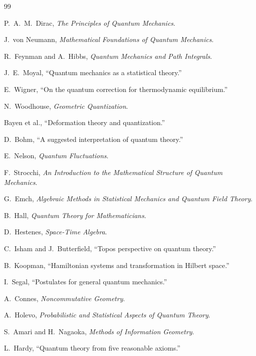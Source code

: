 \documentclass[11pt]{article}
\begin{document}
\begin{thebibliography}{99}

P.~A.~M.~Dirac,
\textit{The Principles of Quantum Mechanics}.

J.~von Neumann,
\textit{Mathematical Foundations of Quantum Mechanics}.

R.~Feynman and A.~Hibbs,
\textit{Quantum Mechanics and Path Integrals}.

J.~E.~Moyal,
``Quantum mechanics as a statistical theory.''

E.~Wigner,
``On the quantum correction for thermodynamic equilibrium.''

N.~Woodhouse,
\textit{Geometric Quantization}.

Bayen et al.,
``Deformation theory and quantization.''

D.~Bohm,
``A suggested interpretation of quantum theory.''

E.~Nelson,
\textit{Quantum Fluctuations}.

F.~Strocchi,
\textit{An Introduction to the Mathematical Structure of Quantum Mechanics}.

G.~Emch,
\textit{Algebraic Methods in Statistical Mechanics and Quantum Field Theory}.

B.~Hall,
\textit{Quantum Theory for Mathematicians}.

D.~Hestenes,
\textit{Space-Time Algebra}.

C.~Isham and J.~Butterfield,
``Topos perspective on quantum theory.''

B.~Koopman,
``Hamiltonian systems and transformation in Hilbert space.''

I.~Segal,
``Postulates for general quantum mechanics.''

A.~Connes,
\textit{Noncommutative Geometry}.

A.~Holevo,
\textit{Probabilistic and Statistical Aspects of Quantum Theory}.

S.~Amari and H.~Nagaoka,
\textit{Methods of Information Geometry}.

L.~Hardy,
``Quantum theory from five reasonable axioms.''

\end{thebibliography}
\end{document}
